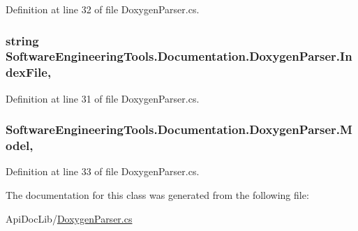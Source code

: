 Definition at line 32 of file Doxygen\+Parser.\+cs.

\hypertarget{class_software_engineering_tools_1_1_documentation_1_1_doxygen_parser_abfeef404cab333dbfa1602536f94c4e7}{
\subsubsection[{Index\+File}]{\setlength{\rightskip}{0pt plus 5cm}string Software\+Engineering\+Tools.\+Documentation.\+Doxygen\+Parser.\+Index\+File\hspace{0.3cm}{\ttfamily [get]}, {\ttfamily [set]}}}\label{class_software_engineering_tools_1_1_documentation_1_1_doxygen_parser_abfeef404cab333dbfa1602536f94c4e7}


Definition at line 31 of file Doxygen\+Parser.\+cs.

\hypertarget{class_software_engineering_tools_1_1_documentation_1_1_doxygen_parser_ab197aca4cd631c97157434f374cc40d6}{
\subsubsection[{Model}]{ Software\+Engineering\+Tools.\+Documentation.\+Doxygen\+Parser.\+Model\hspace{0.3cm}{\ttfamily [get]}, {\ttfamily [set]}}}\label{class_software_engineering_tools_1_1_documentation_1_1_doxygen_parser_ab197aca4cd631c97157434f374cc40d6}


Definition at line 33 of file Doxygen\+Parser.\+cs.



The documentation for this class was generated from the following file\+:\begin{DoxyCompactItemize}
\item 
Api\+Doc\+Lib/\hyperlink{_doxygen_parser_8cs}{Doxygen\+Parser.\+cs}\end{DoxyCompactItemize}
